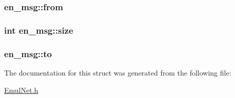 \subsubsection[{from}]{ en\+\_\+msg\+::from}\label{structen__msg_adbad5e8a9e8b7711d36d0c5d24f1c450}
\hypertarget{structen__msg_a27abf25d730baec522335832f45aa326}{}
\subsubsection[{size}]{\setlength{\rightskip}{0pt plus 5cm}int en\+\_\+msg\+::size}\label{structen__msg_a27abf25d730baec522335832f45aa326}
\hypertarget{structen__msg_a20e7e03059b603a54a98841ffcc56501}{}
\subsubsection[{to}]{ en\+\_\+msg\+::to}\label{structen__msg_a20e7e03059b603a54a98841ffcc56501}


The documentation for this struct was generated from the following file\+:\begin{DoxyCompactItemize}
\item 
\hyperlink{_emul_net_8h}{Emul\+Net.\+h}\end{DoxyCompactItemize}
